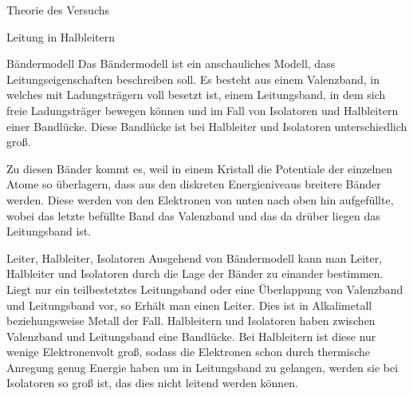 \documentclass[pdftex, a4paper,11pt, twoside, ngerman]{report}
\begin{document}
  
  
  
  
  
  
  
  
  
  \tableofcontents
  
  
  
  \begin{chapter}{Theorie des Versuchs}
    \label{chp:Theorie}
   
    \begin{section}{Leitung in Halbleitern}
        \begin{subsection}{Bändermodell}
            Das Bändermodell ist ein anschauliches Modell, dass Leitungseigenschaften beschreiben soll. 
            Es besteht aus einem Valenzband, in welches mit Ladungsträgern voll besetzt ist, einem Leitungsband, in dem sich freie Ladungsträger bewegen können und im Fall von Isolatoren und Halbleitern einer Bandlücke.
            Diese Bandlücke ist bei Halbleiter und Isolatoren unterschiedlich groß.

            Zu diesen Bänder kommt es, weil in einem Kristall die Potentiale der einzelnen Atome so überlagern, dass aus den diskreten Energieniveaus breitere Bänder werden.
            Diese werden von den Elektronen von unten nach oben hin aufgefüllte, wobei das letzte befüllte Band das Valenzband und das da drüber liegen das Leitungsband ist.
            

        \end{subsection}

        \begin{subsection}{Leiter, Halbleiter, Isolatoren}
            Ausgehend von Bändermodell kann man Leiter, Halbleiter und Isolatoren durch die Lage der Bänder zu einander bestimmen.
            Liegt nur ein teilbestetztes Leitungsband oder eine Überlappung von Valenzband und Leitungsband vor, so Erhält man einen Leiter.
            Dies ist in Alkalimetall beziehungsweise Metall der Fall.
            Halbleitern und Isolatoren haben zwischen Valenzband und Leitungsband eine Bandlücke. 
            Bei Halbleitern ist diese nur wenige Elektronenvolt groß, sodass die Elektronen schon durch thermische Anregung genug Energie haben um in Leitungsband zu gelangen, werden sie bei Isolatoren so groß ist, das dies nicht leitend werden können.


\end{subsection}
\end{section}
\end{chapter}
\end{document}
